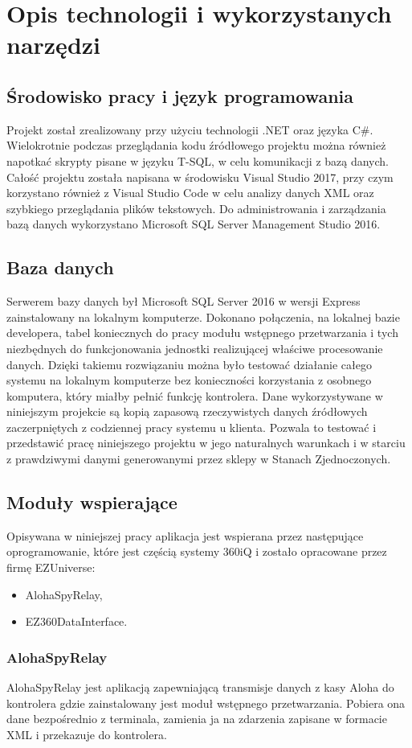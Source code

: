 \documentclass[a4paper]{book}
\begin{document}
\section{Opis technologii i wykorzystanych narzędzi}
\subsection{Środowisko pracy i język programowania}
Projekt został zrealizowany przy użyciu technologii .NET oraz języka C\#.
Wielokrotnie podczas przeglądania kodu źródłowego projektu można również napotkać skrypty pisane w języku T-SQL, w celu komunikacji z bazą danych.
Całość projektu została napisana w środowisku Visual Studio 2017, przy czym korzystano również z Visual Studio Code w celu analizy danych XML oraz szybkiego przeglądania plików tekstowych.
Do administrowania i zarządzania bazą danych wykorzystano Microsoft SQL Server Management Studio 2016. 
\subsection{Baza danych}
Serwerem bazy danych był Microsoft SQL Server 2016 w wersji Express zainstalowany na lokalnym komputerze. Dokonano połączenia, na lokalnej bazie developera, tabel koniecznych do pracy modułu wstępnego przetwarzania i tych niezbędnych do funkcjonowania jednostki realizującej właściwe procesowanie danych.
Dzięki takiemu rozwiązaniu można było testować działanie całego systemu na lokalnym komputerze bez konieczności korzystania z osobnego komputera, który miałby pełnić funkcję kontrolera.
Dane wykorzystywane w niniejszym projekcie są kopią zapasową rzeczywistych danych źródłowych zaczerpniętych z codziennej pracy systemu u klienta. Pozwala to testować i przedstawić pracę niniejszego projektu w jego naturalnych warunkach i w starciu z prawdziwymi danymi generowanymi przez sklepy w Stanach Zjednoczonych.
\subsection{Moduły wspierające}
Opisywana w niniejszej pracy aplikacja jest wspierana przez następujące oprogramowanie, które jest częścią systemy 360iQ i zostało opracowane przez firmę EZUniverse:
 \begin{itemize}
 	\item AlohaSpyRelay,
 	\item EZ360DataInterface.
 \end{itemize}
\subsubsection{AlohaSpyRelay}
AlohaSpyRelay jest aplikacją zapewniającą transmisje danych z kasy Aloha do kontrolera gdzie zainstalowany jest moduł wstępnego przetwarzania. Pobiera ona dane bezpośrednio z terminala, zamienia ja na zdarzenia zapisane w formacie XML i przekazuje do kontrolera.
\end{document}
